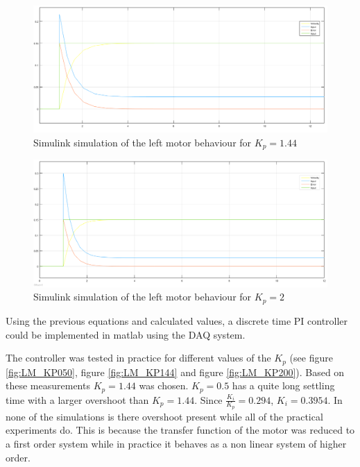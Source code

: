 \begin{figure}[htbp]
\centering
\includegraphics[width = \textwidth]{pics/LM_KP144_Sim.png}
\caption{Simulink simulation of the left motor behaviour for $K_p = 1.44$}
\label{fig:LM_SIM_KP144}
\end{figure}

\begin{figure}[htbp]
\centering
\includegraphics[width = \textwidth]{pics/LM_KP200_sim.png}
\caption{Simulink simulation of the left motor behaviour for $K_p = 2$}
\label{fig:LM_SIM_KP200}
\end{figure}

\FloatBarrier

Using the previous equations and calculated values, a discrete time PI controller could be implemented in matlab using the DAQ system.

The controller was tested in practice for different values of the $K_p$ (see figure \ref{fig:LM_KP050}, figure \ref{fig:LM_KP144} and figure \ref{fig:LM_KP200}). Based on these measurements $K_p = 1.44$ was chosen. $K_p = 0.5$ has a quite long settling time with a larger overshoot than $K_p = 1.44$.  Since $\frac{K_i}{K_p} = 0.294$, $K_i = 0.3954$. In none of the simulations is there overshoot present while all of the practical experiments do. This is because the transfer function of the motor was reduced to a first order system while in practice it behaves as a non linear system of higher order. 

